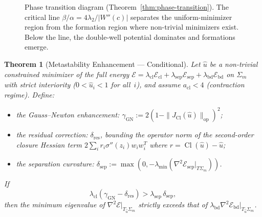 \documentclass[lettersize,journal]{IEEEtran}
\newtheorem{theorem}{Theorem}
\DeclareMathOperator{\Cl}{Cl}
\begin{document}
\begin{figure}[!t]
\centering
{}
\caption{Phase transition diagram (Theorem~\ref{thm:phase-transition}). The critical line $\beta/\alpha = 4\lambda_2/|W''(c)|$ separates the uniform-minimizer region from the formation region where non-trivial minimizers exist. Below the line, the double-well potential dominates and formations emerge.}
\label{fig:phase-transition}
\end{figure}

\begin{theorem}[Metastability Enhancement --- Conditional]
\label{thm:metastability}
Let $\hat{u}$ be a non-trivial constrained minimizer of the full energy $\mathcal{E} = \lambda_{\mathrm{cl}}\mathcal{E}_{\mathrm{cl}} + \lambda_{\mathrm{sep}}\mathcal{E}_{\mathrm{sep}} + \lambda_{\mathrm{bd}}\mathcal{E}_{\mathrm{bd}}$ on $\Sigma_m$ with strict interiority ($0 < \hat{u}_i < 1$ for all~$i$), and assume $a_{\mathrm{cl}} < 4$ (contraction regime). Define:
\begin{itemize}
\item the \emph{Gauss--Newton enhancement}: $\gamma_{\mathrm{GN}} := 2(1 - \|J_{\Cl}(\hat{u})\|_{\mathrm{op}})^2$;
\item the \emph{residual correction}: $\delta_{\mathrm{res}}$, bounding the operator norm of the second-order closure Hessian term $2\sum_i r_i \sigma''(z_i) w_i w_i^T$ where $r = \Cl(\hat{u}) - \hat{u}$;
\item the \emph{separation curvature}: $\delta_{\mathrm{sep}} := \max(0, -\lambda_{\min}(\nabla^2\mathcal{E}_{\mathrm{sep}}|_{T\Sigma_m}))$.
\end{itemize}
If
\begin{equation}
\lambda_{\mathrm{cl}}(\gamma_{\mathrm{GN}} - \delta_{\mathrm{res}}) > \lambda_{\mathrm{sep}}\,\delta_{\mathrm{sep}},
\end{equation}
then the minimum eigenvalue of $\nabla^2\mathcal{E}|_{T_{\hat{u}}\Sigma_m}$ strictly exceeds that of $\lambda_{\mathrm{bd}}\nabla^2\mathcal{E}_{\mathrm{bd}}|_{T_{\hat{u}}\Sigma_m}$.
\end{theorem}
\end{document}
